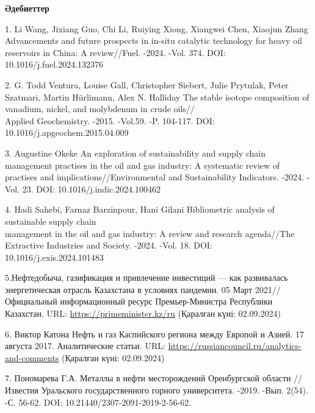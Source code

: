 \begin{center}
  {\bfseries Әдебиеттер}
  \end{center}
  \begin{references}


1. Li Wang, Jixiang Guo, Chi Li, Ruiying Xiong, Xiangwei Chen, Xiaojun
Zhang Advancements and future prospects in in-situ catalytic technology
for heavy oil reservoirs in China: A review//Fuel. -2024. -Vol. 374.
DOI: 10.1016/j.fuel.2024.132376

2. G. Todd Ventura, Louise Gall, Christopher Siebert, Julie Prytulak,
Peter Szatmari, Martin Hürlimann, Alex N. Halliday The stable isotope
composition of vanadium, nickel, and molybdenum in crude oils//\\Applied
Geochemistry. -2015. -Vol.59. -P. 104-117. DOI:
10.1016/j.apgeochem.2015.04.009

3. Augustine Okeke An exploration of sustainability and supply chain
management practises in the oil and gas industry: A systematic review of
practises and implications//Environmental and Sustainability Indicators.
-2024. -Vol. 23. DOI: 10.1016/j.indic.2024.100462

4. Hadi Sahebi, Farnaz Barzinpour, Hani Gilani Bibliometric analysis of
sustainable supply chain \\management in the oil and gas industry: A
review and research agenda//The Extractive Industries and Society.
-2024. -Vol. 18. DOI: 10.1016/j.exis.2024.101483

5.Нефтедобыча, газификация и привлечение инвестиций --- как развивалась
энергетическая отрасль Казахстана в условиях пандемии. 05 Март
2021//Официальный информационный ресурс Премьер-Министра Республики
Казахстан. 
URL:
\href{https://primeminister.kz/ru/news/neftedobycha-gazifikaciya-i-privlechenie-investiciy-kak-razvivalas-energeticheskaya-otrasl-kazahstana-v-usloviyah-pandemii-52034}{https://primeminister.kz/ru}
(Қаралған күні: 02.09.2024)

6. Виктор Катона Нефть и газ Каспийского региона между Европой и Азией.
17 августа 2017. Аналитические статьи. URL:
\href{https://russiancouncil.ru/analytics-and-comments/analytics/neft-i-gaz-kaspiyskogo-regiona-mezhdu-evropoy-i-aziey/}{https://russiancouncil.ru/analytics-and-comments}
(Қаралған күні: 02.09.2024)

7. Пономарева Г.А. Металлы в нефти месторождений Оренбургской области
//Известия Уральского государственного горного университета. -2019.
-Вып. 2(54). -С. 56-62. DOI: 10.21440/2307-2091-2019-2-56-62.


\end{references}
